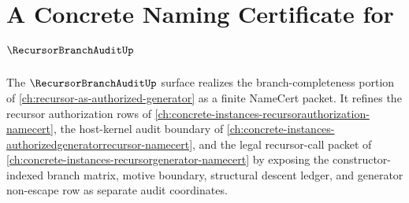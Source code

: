 \chapter{A Concrete Naming Certificate for $\RecursorBranchAuditUp$}
\label{ch:concrete-instances-recursor-branch-audit-namecert}

The $\RecursorBranchAuditUp$ surface realizes the branch-completeness portion of \autoref{ch:recursor-as-authorized-generator} as a finite NameCert packet. It refines the recursor authorization rows of \autoref{ch:concrete-instances-recursorauthorization-namecert}, the host-kernel audit boundary of \autoref{ch:concrete-instances-authorizedgeneratorrecursor-namecert}, and the legal recursor-call packet of \autoref{ch:concrete-instances-recursorgenerator-namecert} by exposing the constructor-indexed branch matrix, motive boundary, structural descent ledger, and generator non-escape row as separate audit coordinates.

